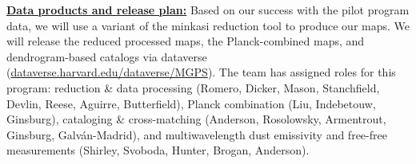 \documentclass[11pt,preprint]{aastex_nofoot}
\begin{document}
\indent\underline{\textbf{\helv Data products and release plan:}}
Based on our success with the pilot program data, we will use a variant of the
minkasi reduction tool to produce our maps.  We will release the reduced
processed maps, the Planck-combined maps, and dendrogram-based catalogs via
dataverse (\url{dataverse.harvard.edu/dataverse/MGPS}).  The team has assigned
roles for this program: reduction \& data processing (Romero, Dicker, Mason,
Stanchfield, Devlin, Reese, Aguirre, Butterfield), Planck combination (Liu,
Indebetouw, Ginsburg),  cataloging \& cross-matching (Anderson, Rosolowsky,
Armentrout, Ginsburg, Galv{\'a}n-Madrid), and multiwavelength dust emissivity
and free-free measurements (Shirley, Svoboda, Hunter, Brogan, Anderson).




\end{document}
